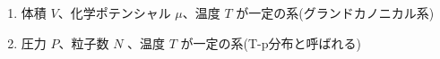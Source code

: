 \documentclass[uplatex,dvipdfmx,a4paper,11pt]{jsarticle}
\newcommand{\diff}{\mathrm d}
\begin{document}
\begin{enumerate}
\begin{enumerate}
\item
体積 $V$、化学ポテンシャル $\mu$、温度 $T$ が一定の系(グランドカノニカル系)

%
%
%	 	
%
%	 	

\item
圧力 $P$、粒子数 $N$ 、温度 $T$ が一定の系(T-p分布と呼ばれる)

%
%
%	 	
%
%	 	

\end{enumerate}


\end{enumerate}
\end{document}
